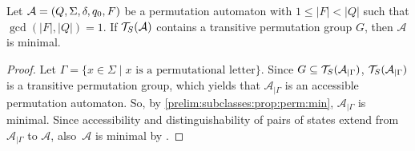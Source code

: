 \begin{corollary}
	Let $\mathcal A = (Q, \Sigma, \delta, q_0, F)$ be a permutation automaton with $1 \le |F| < |Q|$
	such that $\gcd(|F|, |Q|) = 1$.
	If $\mathcal T_S(\mathcal A)$ contains a transitive permutation group $G$,
	then $\mathcal A$ is minimal.
\end{corollary}
\begin{proof}
    Let $\Gamma = \{ x \in \Sigma \mid \text{$x$ is a permutational letter} \}$.
    Since $G \subseteq \mathcal T_S(\mathcal A_{|\Gamma})$,
    $\mathcal T_S(\mathcal A_{|\Gamma})$ is a transitive permutation group,
    which yields that $\mathcal A_{|\Gamma}$
    is an accessible permutation automaton.
    So, by \cref{prelim:subclasses:prop:perm:min}, 
    $\mathcal A_{|\Gamma}$ is minimal.
    Since accessibility and distinguishability
    of pairs of states extend
    from~$\mathcal A_{|\Gamma}$ to $\mathcal A$,
    also~$\mathcal A$ is minimal by .
\end{proof}